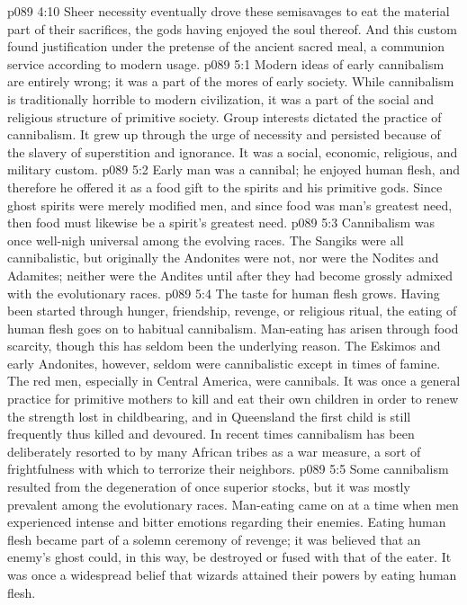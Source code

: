 \vs p089 4:10 Sheer necessity eventually drove these semisavages to eat the material part of their sacrifices, the gods having enjoyed the soul thereof. And this custom found justification under the pretense of the ancient sacred meal, a communion service according to modern usage.
\vs p089 5:1 Modern ideas of early cannibalism are entirely wrong; it was a part of the mores of early society. While cannibalism is traditionally horrible to modern civilization, it was a part of the social and religious structure of primitive society. Group interests dictated the practice of cannibalism. It grew up through the urge of necessity and persisted because of the slavery of superstition and ignorance. It was a social, economic, religious, and military custom.
\vs p089 5:2 Early man was a cannibal; he enjoyed human flesh, and therefore he offered it as a food gift to the spirits and his primitive gods. Since ghost spirits were merely modified men, and since food was man’s greatest need, then food must likewise be a spirit’s greatest need.
\vs p089 5:3 Cannibalism was once well\hyp{}nigh universal among the evolving races. The Sangiks were all cannibalistic, but originally the Andonites were not, nor were the Nodites and Adamites; neither were the Andites until after they had become grossly admixed with the evolutionary races.
\vs p089 5:4 The taste for human flesh grows. Having been started through hunger, friendship, revenge, or religious ritual, the eating of human flesh goes on to habitual cannibalism. Man\hyp{}eating has arisen through food scarcity, though this has seldom been the underlying reason. The Eskimos and early Andonites, however, seldom were cannibalistic except in times of famine. The red men, especially in Central America, were cannibals. It was once a general practice for primitive mothers to kill and eat their own children in order to renew the strength lost in childbearing, and in Queensland the first child is still frequently thus killed and devoured. In recent times cannibalism has been deliberately resorted to by many African tribes as a war measure, a sort of frightfulness with which to terrorize their neighbors.
\vs p089 5:5 Some cannibalism resulted from the degeneration of once superior stocks, but it was mostly prevalent among the evolutionary races. Man\hyp{}eating came on at a time when men experienced intense and bitter emotions regarding their enemies. Eating human flesh became part of a solemn ceremony of revenge; it was believed that an enemy’s ghost could, in this way, be destroyed or fused with that of the eater. It was once a widespread belief that wizards attained their powers by eating human flesh.
